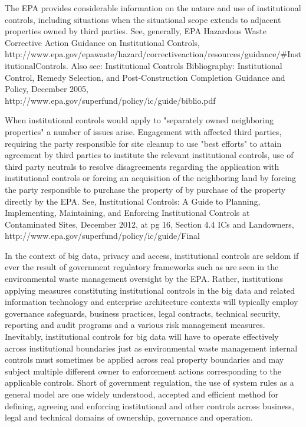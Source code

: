 The EPA provides considerable information on the nature and use of institutional controls, including situations when the situational scope extends to adjacent properties owned by third parties.
See, generally, EPA Hazardous Waste Corrective Action Guidance on Institutional Controls, http://www.epa.gov/epawaste/hazard/correctiveaction/resources/guidance/\#InstitutionalControls.
Also see: Institutional Controls Bibliography: Institutional Control, Remedy Selection, and Post-Construction Completion Guidance and Policy, December 2005, http://www.epa.gov/superfund/policy/ic/guide/biblio.pdf

When institutional controls would apply to "separately owned neighboring properties" a number of issues arise.
Engagement with affected third parties, requiring the party responsible for site cleanup to use "best efforts" to attain agreement by third parties to institute the relevant institutional controls, use of third party neutrals to resolve disagreements regarding the application with institutional controls or forcing an acquisition of the neighboring land by forcing the party responsible to purchase the property of by purchase of the property directly by the EPA.
See, Institutional Controls: A Guide to Planning, Implementing, Maintaining, and Enforcing Institutional Controls at Contaminated Sites, December 2012, at pg 16, Section 4.4 ICs and Landowners, http://www.epa.gov/superfund/policy/ic/guide/Final%

In the context of big data, privacy and access, institutional controls are seldom if ever the result of government regulatory frameworks such as are seen in the environmental waste management oversight by the EPA.
Rather, institutions applying measures constituting institutional controls in the big data and related information technology and enterprise architecture contexts will typically employ governance safeguards, business practices, legal contracts, technical security, reporting and audit programs and a various risk management measures.
Inevitably, institutional controls for big data will have to operate effectively across institutional boundaries just as environmental waste management internal controls must sometimes be applied across real property boundaries and may subject multiple different owner to enforcement actions corresponding to the applicable controls.
Short of government regulation, the use of system rules as a general model are one widely understood, accepted and efficient method for defining, agreeing and enforcing institutional and other controls across business, legal and technical domains of ownership, governance and operation.


